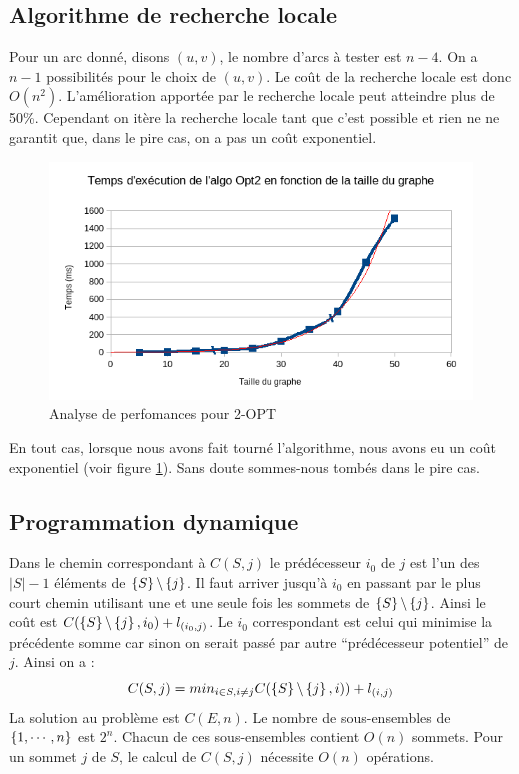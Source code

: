 \documentclass[11pt]{article} \usepackage[top=2cm, bottom=2cm, left=2cm, right=2cm]{geometry}
\begin{document}
\subsection*{Algorithme de recherche locale}
Pour un arc donné, disons $(u,v)$, le nombre d'arcs à tester est $n-4$. On a $n-1$ possibilités pour le choix de
$(u,v)$. Le coût de la recherche locale est donc $O(n^2)$. L'amélioration apportée par le recherche locale peut
atteindre plus de 50\%. Cependant on itère la recherche locale tant que c'est possible et rien ne ne garantit que, dans
le pire cas, on a pas un coût exponentiel. 
  \begin{figure}[ht]
\begin{center}
  \includegraphics[scale=0.8]{images/exec_opt2.png}
  \caption{Analyse de perfomances pour 2-OPT}
  \label{fig:opt2}
\end{center}
\end{figure}
En tout cas, lorsque nous avons fait tourné l'algorithme, nous avons eu un
coût exponentiel (voir figure \ref{fig:opt2}). Sans doute sommes-nous tombés dans le pire cas.
\subsection*{Programmation dynamique}
Dans le chemin correspondant à $C(S,j)$ le prédécesseur $i_0$ de $j$ est l'un des $|S|-1$ éléments de
$\left\{S\right\} \backslash \left\{j\right\}$. Il faut arriver jusqu'à $i_0$ en passant par le plus court chemin utilisant une et une
seule fois les sommets de $\left\{S\right\} \backslash \left\{j\right\}$. Ainsi le coût est 
$C(\left\{S\right\} \backslash \left\{j\right\},i_0) + l_{(i_0,j)}$. Le $i_0$ correspondant est celui qui minimise la précédente somme car
sinon on serait passé par autre \enquote{prédécesseur potentiel} de $j$. Ainsi on a :
\begin{displaymath}
  C(S,j) = min_{i \in S , i \neq j}C(\left\{S\right\} \backslash \left\{j\right\},i)) + l_{(i,j)}
\end{displaymath}
La solution au problème est $C(E,n)$.
 Le nombre de sous-ensembles de $\left\{1,\cdots,n\right\}$ est $2^n$. Chacun de ces sous-ensembles contient $O(n)$ sommets. Pour
 un sommet $j$ de $S$, le calcul de $C(S,j)$ nécessite $O(n)$ opérations. 
\end{document}
